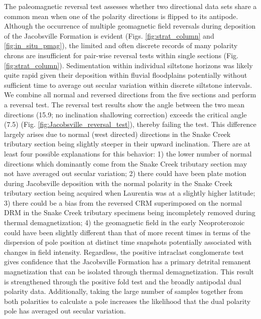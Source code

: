 The paleomagnetic reversal test assesses whether two directional data sets share a common mean when one of the polarity directions is flipped to its antipode. Although the occurrence of multiple geomagnetic field reversals during deposition of the Jacobsville Formation is evident (Figs. \ref{fig:strat_column} and \ref{fig:in_situ_pmag}), the limited and often discrete records of many polarity chrons are insufficient for pair-wise reversal tests within single sections (Fig. \ref{fig:strat_column}). Sedimentation within individual siltstone horizons was likely quite rapid given their deposition within fluvial floodplains potentially without sufficient time to average out secular variation within discrete siltstone intervals. We combine all normal and reversed directions from the five sections and perform a reversal test. The \cite{McFadden1990a} reversal test results show the angle between the two mean directions (15.9\textdegree; no inclination shallowing correction) exceeds the critical angle (7.5\textdegree) (Fig. \ref{fig:Jacobsville_reversal_test}), thereby failing the test. This difference largely arises due to normal (west directed) directions in the Snake Creek tributary section being slightly steeper in their upward inclination. There are at least four possible explanations for this behavior: 1) the lower number of normal directions which dominantly come from the Snake Creek tributary section may not have averaged out secular variation; 2) there could have been plate motion during Jacobsville deposition with the normal polarity in the Snake Creek tributary section being acquired when Laurentia was at a slightly higher latitude; 3) there could be a bias from the reversed CRM superimposed on the normal DRM in the Snake Creek tributary specimens being incompletely removed during thermal demagnetization; 4) the geomagnetic field in the early Neoproterozoic could have been slightly different than that of more recent times in terms of the dispersion of pole position at distinct time snapshots potentially associated with changes in field intensity. Regardless, the positive intraclast conglomerate test gives confidence that the Jacobsville Formation has a primary detrital remanent magnetization that can be isolated through thermal demagnetization. This result is strengthened through the positive fold test and the broadly antipodal dual polarity data. Additionally, taking the large number of samples together from both polarities to calculate a pole increases the likelihood that the dual polarity pole has averaged out secular variation.

